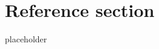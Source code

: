 \documentclass{article}
\begin{document}
\pagebreak
\section*{Reference section} \label{sec:reference}
\begin{description}
	\item[placeholder] \hfill \\
\end{description}
\end{document}
